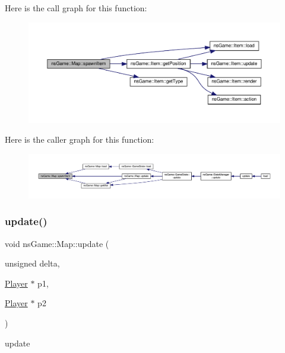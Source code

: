 Here is the call graph for this function\+:\nopagebreak
\begin{figure}[H]
\begin{center}
\leavevmode
\includegraphics[width=350pt]{classns_game_1_1_map_a7197e3e471d8a827ad195e74707f4052_cgraph}
\end{center}
\end{figure}
Here is the caller graph for this function\+:\nopagebreak
\begin{figure}[H]
\begin{center}
\leavevmode
\includegraphics[width=350pt]{classns_game_1_1_map_a7197e3e471d8a827ad195e74707f4052_icgraph}
\end{center}
\end{figure}
\mbox{\label{classns_game_1_1_map_a2b7108ae33859839be0b85329f729de9}} 
\subsubsection{\texorpdfstring{update()}{update()}}
{\footnotesize\ttfamily void ns\+Game\+::\+Map\+::update (\begin{DoxyParamCaption}\item[{unsigned}]{delta,  }\item[{\hyperlink{classns_game_1_1_player}{Player} $\ast$}]{p1,  }\item[{\hyperlink{classns_game_1_1_player}{Player} $\ast$}]{p2 }\end{DoxyParamCaption})}



update 


